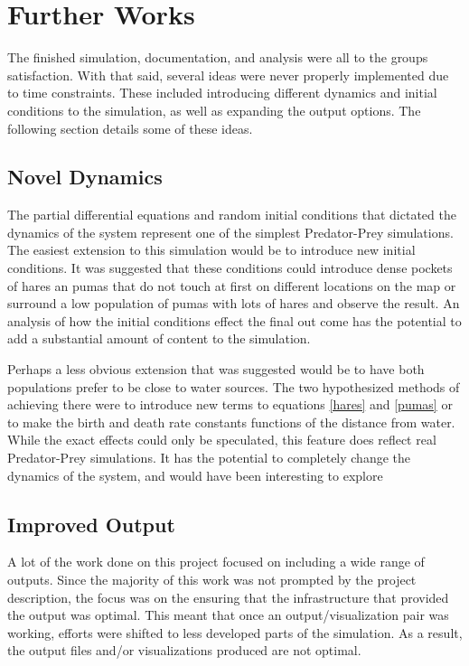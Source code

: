 \documentclass[a4paper,11pt]{article}
\begin{document}
\section{Further Works}

The finished simulation, documentation, and analysis were all to the groups satisfaction.  With that said, several ideas were never properly implemented due to time constraints.  These included introducing different dynamics and initial conditions to the simulation, as well as expanding the output options.  The following section details some of these ideas.

\subsection{Novel Dynamics}

The partial differential equations and random initial conditions that dictated the dynamics of the system represent one of the simplest Predator-Prey simulations.  The easiest extension to this simulation would be to introduce new initial conditions.  It was suggested that these conditions could introduce dense pockets of hares an pumas that do not touch at first on different locations on the map or surround a low population of pumas with lots of hares  and observe the result.  An analysis of how the initial conditions effect the final out come has the potential to add a substantial amount of content to the simulation.  

Perhaps a less obvious extension that was suggested would be to have both populations prefer to be close to water sources.  The two hypothesized methods of achieving there were to introduce new terms to equations \eqref{hares} and \eqref{pumas} or to make the birth and death rate constants functions of the distance from water.  While the exact effects could only be speculated, this feature does reflect real Predator-Prey simulations.  It has the potential to completely change the dynamics of the system, and would have been interesting to explore

\subsection{Improved Output}

A lot of the work done on this project focused on including a wide range of outputs.  Since the majority of this work was not prompted by the project description, the focus was on the ensuring that the infrastructure that provided the output was optimal.  This meant that once an output/visualization pair was working, efforts were shifted to less developed parts of the simulation.  As a result, the output files and/or visualizations produced are not optimal.  
\end{document}
